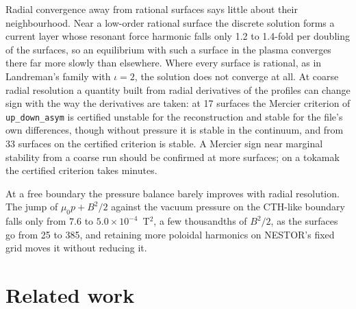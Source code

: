 \documentclass[11pt]{article}
\newcommand{\code}[1]{\texttt{#1}}
\begin{document}
Radial convergence away from rational surfaces says little about their
neighbourhood. Near a low-order rational surface the discrete solution forms a
current layer whose resonant force harmonic falls only 1.2 to 1.4-fold per
doubling of the surfaces, so an
equilibrium with such a surface in the plasma converges there far more slowly
than elsewhere. Where every surface is rational, as in Landreman's family with
$\iota=2$, the solution does not converge at all. At coarse radial resolution a
quantity built from radial derivatives of the profiles can change sign with the
way the derivatives are taken: at 17 surfaces the Mercier criterion of
\code{up\_down\_asym} is certified unstable for the reconstruction and stable for
the file's own differences, though without pressure it is stable in the
continuum, and from 33 surfaces on the certified criterion is stable. A Mercier sign near marginal stability from a coarse run should be
confirmed at more surfaces; on a tokamak the certified criterion takes minutes.

At a free boundary the pressure balance barely improves with radial
resolution. The jump of $\mu_0p+B^2/2$ against the vacuum pressure on the
CTH-like boundary falls only from $7.6$ to $5.0\times10^{-4}$~T$^2$, a few
thousandths of $B^2/2$, as the surfaces go from 25 to 385, and retaining more
poloidal harmonics on NESTOR's fixed grid moves it without reducing it.

\section{Related work}
\end{document}
